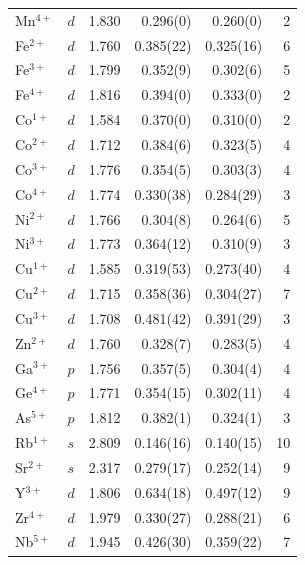 \begin{longtable}{l l r r r r}
  Mn$^{4+}$            & $d$   & 1.830 &       0.296(0) &       0.260(0) & 2 \\
  Fe$^{2+}$            & $d$   & 1.760 &      0.385(22) &      0.325(16) & 6 \\
  Fe$^{3+}$            & $d$   & 1.799 &       0.352(9) &       0.302(6) & 5 \\
  Fe$^{4+}$            & $d$   & 1.816 &       0.394(0) &       0.333(0) & 2 \\
  Co$^{1+}$            & $d$   & 1.584 &       0.370(0) &       0.310(0) & 2 \\
  Co$^{2+}$            & $d$   & 1.712 &       0.384(6) &       0.323(5) & 4 \\
  Co$^{3+}$            & $d$   & 1.776 &       0.354(5) &       0.303(3) & 4 \\
  Co$^{4+}$            & $d$   & 1.774 &      0.330(38) &      0.284(29) & 3 \\
  Ni$^{2+}$            & $d$   & 1.766 &       0.304(8) &       0.264(6) & 5 \\
  Ni$^{3+}$            & $d$   & 1.773 &      0.364(12) &       0.310(9) & 3 \\
  Cu$^{1+}$            & $d$   & 1.585 &      0.319(53) &      0.273(40) & 4 \\
  Cu$^{2+}$            & $d$   & 1.715 &      0.358(36) &      0.304(27) & 7 \\
  Cu$^{3+}$            & $d$   & 1.708 &      0.481(42) &      0.391(29) & 3 \\
  Zn$^{2+}$            & $d$   & 1.760 &       0.328(7) &       0.283(5) & 4 \\
  Ga$^{3+}$            & $p$   & 1.756 &       0.357(5) &       0.304(4) & 4 \\
  Ge$^{4+}$            & $p$   & 1.771 &      0.354(15) &      0.302(11) & 4 \\
  As$^{5+}$            & $p$   & 1.812 &       0.382(1) &       0.324(1) & 3 \\
  Rb$^{1+}$            & $s$   & 2.809 &      0.146(16) &      0.140(15) & 10 \\
  Sr$^{2+}$            & $s$   & 2.317 &      0.279(17) &      0.252(14) & 9 \\
  Y$^{3+}$             & $d$   & 1.806 &      0.634(18) &      0.497(12) & 9 \\
  Zr$^{4+}$            & $d$   & 1.979 &      0.330(27) &      0.288(21) & 6 \\
  Nb$^{5+}$            & $d$   & 1.945 &      0.426(30) &      0.359(22) & 7 \\

\end{longtable}
